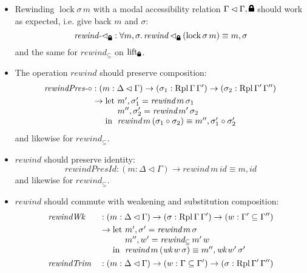 \documentclass{article}
\newcommand{\lock}{
  \text{\tikz[baseline]{
      \fill[rounded corners=.1ex] (-.75ex,0) rectangle ++(1.5ex,1ex);
      \draw[line width=.3ex] (-.45ex,.5ex) -- ++(0,.75ex) arc (180:0:.45ex) -- ++(0,-.75ex);
}}}
\begin{document}
\begin{itemize}
\item Rewinding $\operatorname{lock} \sigma \, m$
  with a modal accessibility relation $\Gamma \lhd \Gamma, \lock$
  should work as expected, i.e. give back $m$ and $\sigma$:
  $$ \textit{rewind-$\lhd_\lock$} : \forall m, \sigma. \, \textit{rewind} \lhd_\lock (\operatorname{lock} \sigma \, m) \equiv m , \sigma $$
  and the same for $\textit{rewind}_\subseteq$ on $\operatorname{lift_\lock}$.
\item The operation $\textit{rewind}$ should preserve composition:
  \begin{align*}
    \textit{rewindPres-$\circ$} &: (m : \Delta\lhd\Gamma) \rightarrow (\sigma_1 : \operatorname{Rpl} \Gamma \, \Gamma') \rightarrow (\sigma_2 : \operatorname{Rpl} \Gamma' \, \Gamma'') \\
    &\rightarrow
    \begin{array}[t]{@{}l@{}l@{}}
      \text{let } & m' , \sigma_1' = \textit{rewind} \, m \, \sigma_1 \\
      & m'' , \sigma_2' = \textit{rewind} \, m' \, \sigma_2 \\
      \text{in } & \textit{rewind} \, m \, (\sigma_1 \circ \sigma_2) \equiv m'' , \sigma_1' \circ \sigma_2'
    \end{array}
  \end{align*}
  and likewise for $\textit{rewind}_\subseteq$.
\item $\textit{rewind}$ should preserve identity:
  $$ \textit{rewindPresId} : (m : \Delta\lhd\Gamma) \rightarrow \textit{rewind} \, m \, id \equiv m , id $$
  and likewise for $\textit{rewind}_\subseteq$.
\item $\textit{rewind}$ should commute with weakening and substitution composition:
  \begin{align*}
    &\textit{rewindWk} &&: (m : \Delta\lhd\Gamma) \rightarrow (\sigma : \operatorname{Rpl} \Gamma \, \Gamma') \rightarrow (w : \Gamma' \subseteq \Gamma'') \\
    &&&\rightarrow
    \begin{array}[t]{@{}l@{}l@{}}
      \text{let } & m' , \sigma' = \textit{rewind} \, m \, \sigma \\
      & m'' , w' = \textit{rewind}_\subseteq \, m' \, w \\
      \text{in } & \textit{rewind} \, m \, (\textit{wk} \, w \, \sigma) \equiv m'' , \textit{wk} \, w' \, \sigma'
    \end{array} \\
    &\textit{rewindTrim} &&: (m : \Delta\lhd\Gamma) \rightarrow (w : \Gamma \subseteq \Gamma') \rightarrow (\sigma : \operatorname{Rpl} \Gamma' \, \Gamma'') \\

\end{align*}
\end{itemize}
\end{document}
